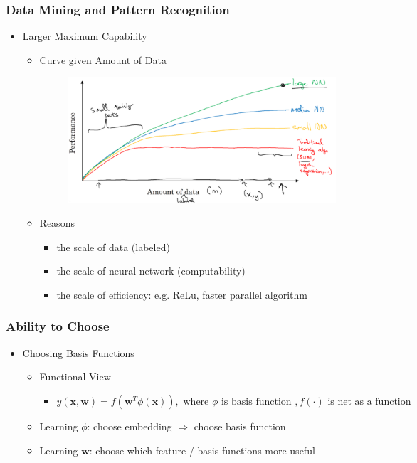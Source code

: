 \subsubsection{Data Mining and Pattern Recognition}
\begin{itemize}
\item Larger Maximum Capability
	\begin{itemize}
	\item Curve given Amount of Data
	\begin{figure}[ht]
	\includegraphics[width=\linewidth]{./Deep Learning/background-largedata.png}
	\end{figure}
	\item Reasons
		\begin{itemize}
		\item the scale of data (labeled)
		\item the scale of neural network (computability)
		\item the scale of efficiency: e.g. ReLu, faster parallel algorithm
		\end{itemize}
	\end{itemize}
\end{itemize}

\subsubsection{Ability to Choose}
\begin{itemize}
\item Choosing Basis Functions
	\begin{itemize}
	\item Functional View
		\begin{itemize}
		\item $\displaystyle y(\mathbf {x}, \mathbf w)=f(\mathbf w^T\phi(\mathbf x)), \text{ where } \phi \text{ is basis function }, f(\cdot) \text{ is net as a function}$
		\end{itemize}
	\item Learning $\phi$: choose embedding $\Rightarrow$ choose basis function
	\item Learning $\mathbf w$: choose which feature / basis functions more useful
	\end{itemize}
\end{itemize}

